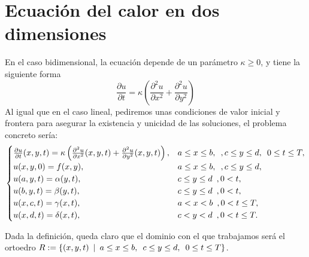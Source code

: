 \section{Ecuación del calor en dos dimensiones}


En el caso bidimensional, la ecuación depende de un parámetro $\kappa\geq0$,  y tiene la siguiente forma
\begin{equation}
	\frac{\partial u}{\partial t}=\kappa\left(\frac{\partial^2u}{\partial x^2}+\frac{\partial^2u}{\partial y^2}\right)
\end{equation}
Al igual que en el caso lineal, pediremos unas condiciones de valor inicial y frontera para asegurar la existencia y unicidad de las soluciones, el problema concreto sería:
\begin{equation}\label{eq:2dheat}
	\begin{cases} 
			\frac{\partial u}{\partial t}(x,y,t) =\kappa\left(\frac{\partial^2u}{\partial x^2}(x,y,t)+\frac{\partial^2u}{\partial y^2}(x,y,t)\right), & a\leq x\leq b, \hspace{5px}, c \leq y \leq d, \hspace{5px} 0\leq t \leq T,\\
		u(x,y,0)=f(x,y), & a\leq x\leq b, \hspace{5px}, c \leq y \leq d, \\
		u(a,y,t)=\alpha(y,t), & c \leq y \leq d \hspace{5px}, 0<t,\\
		u(b,y,t)=\beta(y,t), & c \leq y \leq d \hspace{5px}, 0<t,\\
		u(x,c,t)=\gamma(x,t), & a < x < b \hspace{5px}, 0<t\leq T,\\
		u(x,d,t)=\delta(x,t), & c < y < d \hspace{5px}, 0<t\leq T.
	\end{cases}
\end{equation}

Dada la definición, queda claro que el dominio con el que trabajamos será el ortoedro $R:=\{(x,y,t) \hspace{5px} | \hspace{5px} a \leq x \leq b, \hspace{5px} c\leq y \leq d, \hspace{5px} 0\leq t \leq T\}$.

